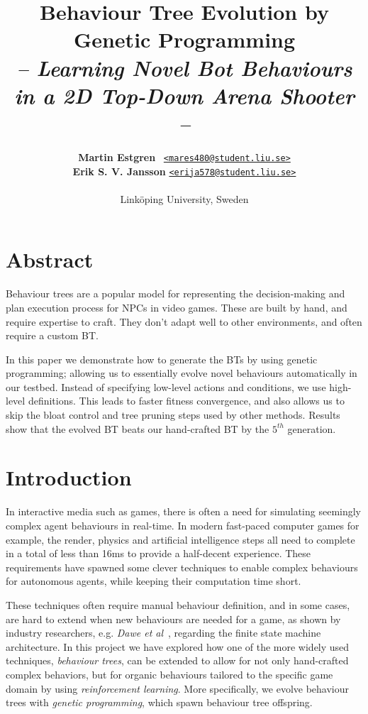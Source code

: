 \documentclass[a4paper, twocolumn]{article}
\title{\textbf{Behaviour Tree Evolution by Genetic Programming}\\
       \Large{\emph{-- Learning Novel Bot Behaviours in a 2D Top-Down Arena Shooter --}}}
\author{{\textbf{Martin Estgren}} \;\;\;\;\;\;\;\;\;\, {\href{mailto:mares480@student.liu.se}
                                                       {\texttt{<mares480@student.liu.se>}}} \\
        {\textbf{Erik S. V. Jansson}} \;\;\;\;         {\href{mailto:erija578@student.liu.se}
                                                       {\texttt{<erija578@student.liu.se>}}} \\~\\
        {Linköping University, Sweden}\vspace{-2.0ex}}
\begin{document}
    \maketitle
    \section*{Abstract}

    Behaviour trees are a popular model for representing the decision-making and plan execution process for NPCs in video games. These are built by hand, and require expertise to craft. They don't adapt well to other environments, and often require a custom BT.

    In this paper we demonstrate how to generate the BTs by using genetic programming; allowing us to essentially evolve novel behaviours automatically in our testbed. Instead of specifying low-level actions and conditions, we use high-level definitions. This leads to faster fitness convergence, and also allows us to skip the bloat control and tree pruning steps used by other methods. Results show that the evolved BT beats our hand-crafted BT by the \(5^{th}\) generation. \footnotemark[1]

    \vspace{1.0em}

    \begingroup
    \def\addvspace#1{}
    \tableofcontents
    \endgroup
    \newpage

    \newpage %
    \nocite{*} %
    
    
    \clearpage

    \section{Introduction} \label{sec:introduction}

    In interactive media such as games, there is often a need for simulating seemingly complex agent behaviours in real-time. In modern fast-paced computer games for example, the render, physics and artificial intelligence steps all need to complete in a total of less than 16ms to provide a half-decent experience. These requirements have spawned some clever techniques to enable complex behaviours for autonomous agents, while keeping their computation time short.

    These techniques often require manual behaviour definition, and in some cases, are hard to extend when new behaviours are needed for a game, as shown by industry researchers, e.g. \emph{Dawe et al}~\cite{dawe2014overview}, regarding the finite state machine architecture. In this project we have explored how one of the more widely used techniques, \emph{behaviour trees}, can be extended to allow for not only hand-crafted complex behaviors, but for organic behaviours tailored to the specific game domain by using \emph{reinforcement learning}. More specifically, we evolve behaviour trees with \emph{genetic programming}, which spawn behaviour tree offspring.
\end{document}
